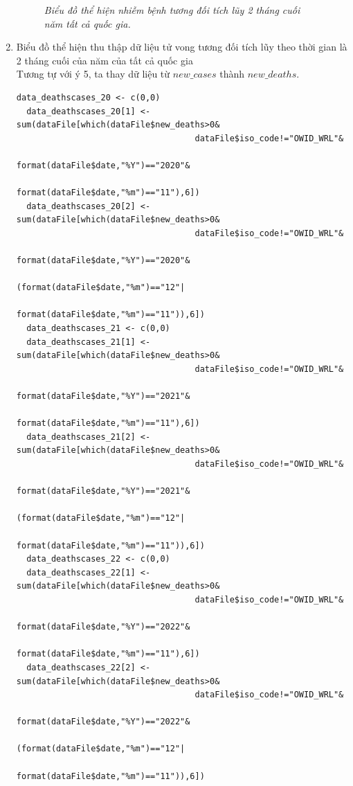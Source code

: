 \documentclass[a4paper]{article}
\theoremstyle{definition}
\begin{document}
\begin{enumerate}[1)]
\begin{figure}[H]
\begin{center}
        \end{center}
        \vspace{+3mm}\caption{\it Biểu đồ thể hiện nhiễm bệnh tương đối tích lũy 2 tháng cuối năm tất cả quốc gia.}
    \end{figure}
\item Biểu đồ thể hiện thu thập dữ liệu tử vong tương đối tích lũy theo thời gian là 2 tháng cuối của năm của tất cả quốc gia\\
Tương tự với ý 5, ta thay dữ liệu từ $new\_cases$ thành $new\_deaths$.
\begin{lstlisting}
data_deathscases_20 <- c(0,0)
  data_deathscases_20[1] <- sum(dataFile[which(dataFile$new_deaths>0&
                                    dataFile$iso_code!="OWID_WRL"&
                                    format(dataFile$date,"%Y")=="2020"&
                                    format(dataFile$date,"%m")=="11"),6]) 
  data_deathscases_20[2] <- sum(dataFile[which(dataFile$new_deaths>0&
                                    dataFile$iso_code!="OWID_WRL"&
                                    format(dataFile$date,"%Y")=="2020"&
                                    (format(dataFile$date,"%m")=="12"|
                                    format(dataFile$date,"%m")=="11")),6]) 
  data_deathscases_21 <- c(0,0)
  data_deathscases_21[1] <- sum(dataFile[which(dataFile$new_deaths>0&
                                    dataFile$iso_code!="OWID_WRL"&
                                    format(dataFile$date,"%Y")=="2021"&
                                    format(dataFile$date,"%m")=="11"),6]) 
  data_deathscases_21[2] <- sum(dataFile[which(dataFile$new_deaths>0&
                                    dataFile$iso_code!="OWID_WRL"&
                                    format(dataFile$date,"%Y")=="2021"&
                                    (format(dataFile$date,"%m")=="12"|
                                    format(dataFile$date,"%m")=="11")),6]) 
  data_deathscases_22 <- c(0,0)
  data_deathscases_22[1] <- sum(dataFile[which(dataFile$new_deaths>0&
                                    dataFile$iso_code!="OWID_WRL"&
                                    format(dataFile$date,"%Y")=="2022"&
                                    format(dataFile$date,"%m")=="11"),6]) 
  data_deathscases_22[2] <- sum(dataFile[which(dataFile$new_deaths>0&
                                    dataFile$iso_code!="OWID_WRL"&
                                    format(dataFile$date,"%Y")=="2022"&
                                    (format(dataFile$date,"%m")=="12"|
                                    format(dataFile$date,"%m")=="11")),6])  

\end{lstlisting}
\end{enumerate}
\end{document}
